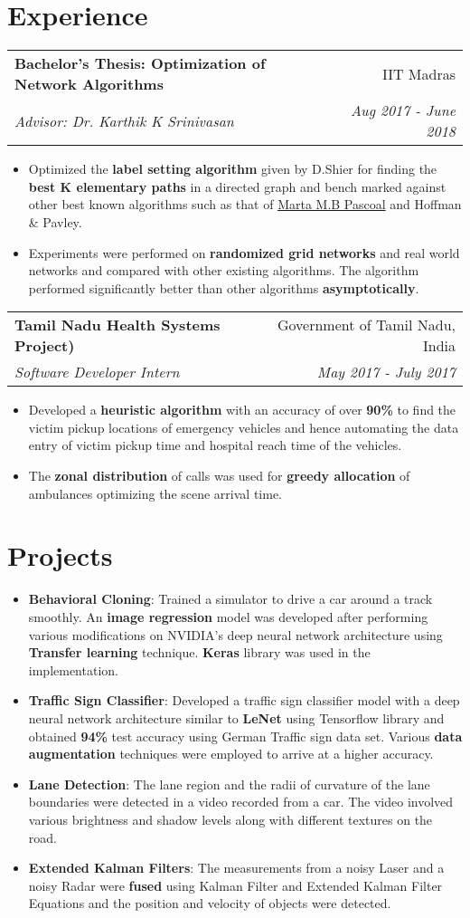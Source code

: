 \documentclass[letterpaper,11pt]{article}
\makeatletter
\newcommand{\resumeItem}[2]{
  \item\small{
    \textbf{#1}{: #2 \vspace{-2pt}}
  }
}
\newcommand{\ritem}[1]{
  \item\small{
    {#1 \vspace{-2pt}}
  }
}
\newcommand{\resumeSubheading}[4]{
  \vspace{-1pt}\item
    \begin{tabular*}{0.97\textwidth}{l@{\extracolsep{\fill}}r}
      \textbf{#1} & #2 \\
      \textit{#3} & \textit{#4} \\
    \end{tabular*}\vspace{-5pt}
}
\newcommand{\resumeSubItem}[2]{\resumeItem{#1}{#2}\vspace{-4pt}}
\newcommand{\resumeSubHeadingListStart}{\begin{description}[leftmargin=*]}
\newcommand{\resumeSubHeadingListEnd}{\end{description}\vspace{-6pt}}
\newcommand{\resumeItemListStart}{\begin{itemize}[leftmargin=*]}
\newcommand{\resumeItemListEnd}{\end{itemize}\vspace{-4pt}}
\makeatother
\begin{document}
\section{Experience}
  \resumeSubHeadingListStart
    \resumeSubheading
      {Bachelor’s Thesis: Optimization of Network Algorithms}{IIT Madras}
      {Advisor: Dr. Karthik K Srinivasan}{Aug 2017 - June 2018}
      \resumeItemListStart
        \justifying\ritem{Optimized the \textbf{label setting algorithm} given by D.Shier for finding the \textbf{best K elementary paths} in a directed graph and bench marked against other best known algorithms such as that of \href{http://www.dis.uniroma1.it/challenge9/papers/pascoal.pdf}{Marta M.B Pascoal} and Hoffman \& Pavley.}
        \ritem{Experiments were performed on \textbf{randomized grid networks} and real world networks and compared with other existing algorithms. The algorithm performed significantly better than other algorithms \textbf{asymptotically}.}
      \resumeItemListEnd
      
    \resumeSubheading
      {Tamil Nadu Health Systems Project)}{Government of Tamil Nadu, India}
      {Software Developer Intern}{May 2017 - July 2017}
      \resumeItemListStart
        \ritem
          {Developed a \textbf{heuristic algorithm} with an accuracy of over \textbf{90\%} to find the victim pickup locations of emergency vehicles and hence automating the data entry of victim pickup time and hospital reach time of the vehicles.}
        \ritem
          {The \textbf{zonal distribution} of calls was used for \textbf{greedy allocation} of ambulances optimizing the scene arrival time.}
      \resumeItemListEnd

  \resumeSubHeadingListEnd

\section{Projects}
  \resumeItemListStart
    \justifying\resumeSubItem{Behavioral Cloning}
      {Trained a simulator to drive a car around a track smoothly. An \textbf{image regression} model was developed after performing various modifications on NVIDIA's deep neural network architecture using \textbf{Transfer learning} technique. \textbf{Keras} library was used in the implementation.}
    \justifying\resumeSubItem{Traffic Sign Classifier}
      {Developed a traffic sign classifier model with a deep neural network architecture similar to \textbf{LeNet} using Tensorflow library and obtained \textbf{94\%} test accuracy using German Traffic sign data set. Various \textbf{data augmentation} techniques were employed to arrive at a higher accuracy.}
    \justifying\resumeSubItem{Lane Detection}
      {The lane region and the radii of curvature of the lane boundaries were detected in a video recorded from a car. The video involved various brightness and shadow levels along with different textures on the road.}
    \justifying\resumeSubItem{Extended Kalman Filters}
      {The measurements from a noisy Laser and a noisy Radar were \textbf{fused} using Kalman Filter and Extended Kalman Filter Equations and the position and velocity of objects were detected.}
  \resumeItemListEnd
\end{document}
